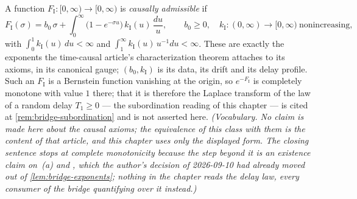 \begin{definition}\label{def:causal-admissible}
\leanok
A function $F_{\mathrm I} : [0,\infty) \to [0,\infty)$ is \emph{causally admissible} if
\[
  F_{\mathrm I}(\sigma) = b_0\,\sigma
   + \int_0^\infty \bigl(1 - e^{-\sigma u}\bigr)\,k_{\mathrm I}(u)\,\frac{du}{u},
  \qquad b_0 \ge 0, \quad k_{\mathrm I} : (0,\infty) \to [0,\infty) \ \text{nonincreasing},
\]
with $\int_0^1 k_{\mathrm I}(u)\,du < \infty$ and
$\int_1^\infty k_{\mathrm I}(u)\,u^{-1}du < \infty$. These are exactly the exponents the
time-causal article's characterization theorem attaches to its axioms, in its canonical gauge;
$(b_0, k_{\mathrm I})$ is its data, its drift and its delay profile. Such an
$F_{\mathrm I}$ is a Bernstein function vanishing at the origin, so $e^{-F_{\mathrm I}}$ is
completely monotone with value $1$ there; that it is therefore the Laplace transform of the law
of a random delay $T_1 \ge 0$ --- the subordination reading of this chapter --- is cited at
\ref{rem:bridge-subordination} and is not asserted here.
\statusT\quad\emph{(Vocabulary. No claim is made here about the causal axioms; the equivalence
of this class with them is the content of that article, and this chapter uses only the
displayed form. The closing sentence stops at complete monotonicity because the step beyond it
is an existence claim on \,(a) and , which the author's decision of
2026-09-10 had already moved out of \ref{lem:bridge-exponents}; nothing in the chapter reads
the delay law, every consumer of the bridge quantifying over it instead.)}
\end{definition}


